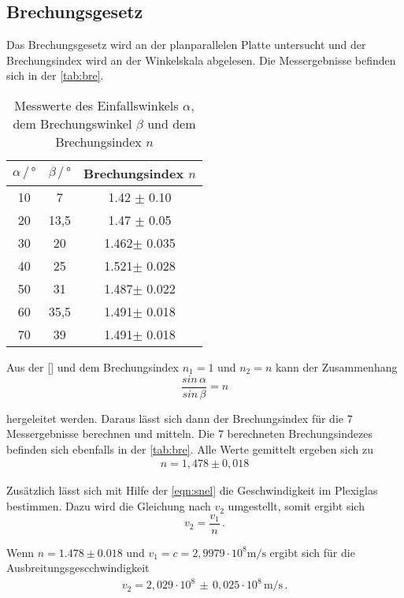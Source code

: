 \subsection{Brechungsgesetz}
Das Brechungsgesetz wird an der planparallelen Platte untersucht und der Brechungsindex wird an der Winkelskala abgelesen. Die Messergebnisse befinden sich in der \autoref{tab:bre}. 
\begin{table}
    \centering
    \caption{Messwerte des Einfallswinkels $\alpha$, dem Brechungswinkel $\beta$ und dem Brechungsindex $n$}
    \label{tab:bre}
    \begin{tabular}{c c c}
    \toprule
         $\alpha \, / \, ° $ & $\beta \, / \, °$ & Brechungsindex $n$\\
    \midrule
    10 & 7    & 1.42 $\pm$ 0.10\\
    20 & 13,5 & 1.47 $\pm$ 0.05\\
    30 & 20   & 1.462$\pm$ 0.035\\
    40 & 25   & 1.521$\pm$ 0.028\\
    50 & 31   & 1.487$\pm$ 0.022\\
    60 & 35,5 & 1.491$\pm$ 0.018\\
    70 & 39   & 1.491$\pm$ 0.018\\
    \bottomrule
    \end{tabular}
\end{table}

\noindent
Aus der \autoref{} und dem Brechungsindex $n_1 = 1$ und $n_2 = n$ kann der Zusammenhang 
\begin{equation}
    \frac{sin \, \alpha}{sin \, \beta} = n
\end{equation}

\noindent
hergeleitet werden.
Daraus lässt sich dann der Brechungsindex für die 7 Messergebnisse berechnen und mitteln. Die 7 berechneten Brechungsindezes befinden sich ebenfalls in der \autoref{tab:bre}.
Alle Werte gemittelt ergeben sich zu 
\begin{align*}
    n = 1,478 \pm 0,018
\end{align*} 

Zusätzlich lässt sich mit Hilfe der \autoref{eqn:snel} die Geschwindigkeit im Plexiglas bestimmen. Dazu wird die Gleichung nach $v_2$ umgestellt, somit ergibt sich
\begin{equation}
    v_2 = \frac{v_1}{n} \, .
\end{equation}

\noindent
Wenn $n = 1.478 \pm 0.018$ und $v_1 = c = 2,9979 \cdot 10^8 \si{\meter\per\second}$ ergibt sich für die Ausbreitungsgescchwindigkeit
\begin{align*}
    v_2 = 2,029 \cdot 10^8 \, \pm \, 0,025 \cdot 10^8 \, \si{\meter\per\second} \, .
\end{align*}

